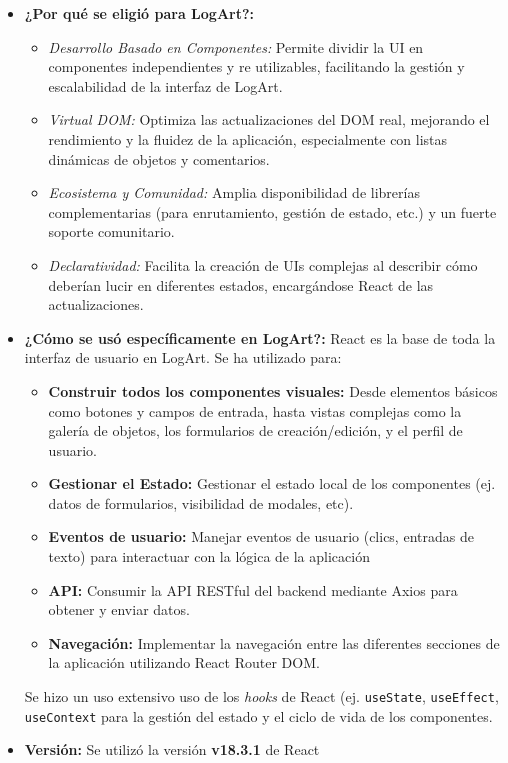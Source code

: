 \begin{itemize}
        \item \textbf{¿Por qué se eligió para LogArt?:}
        \begin{itemize}
            \item \textit{Desarrollo Basado en Componentes:} Permite dividir la UI en componentes independientes y re utilizables, facilitando la gestión y escalabilidad de la interfaz de LogArt.
            \item \textit{Virtual DOM:} Optimiza las actualizaciones del DOM real, mejorando el rendimiento y la fluidez de la aplicación, especialmente con listas dinámicas de objetos y comentarios.
            \item \textit{Ecosistema y Comunidad:} Amplia disponibilidad de librerías complementarias (para enrutamiento, gestión de estado, etc.) y un fuerte soporte comunitario.
            \item \textit{Declaratividad:} Facilita la creación de UIs complejas al describir cómo deberían lucir en diferentes estados, encargándose React de las actualizaciones.
        \end{itemize}
    \item \textbf{¿Cómo se usó específicamente en LogArt?:} React es la base de toda la interfaz de usuario en LogArt. Se ha utilizado para:
        \begin{itemize}
            \item \textbf{Construir todos los componentes visuales:} Desde elementos básicos como botones y campos de entrada, hasta vistas complejas como la galería de objetos, los formularios de creación/edición, y el perfil de usuario.
            \item \textbf{Gestionar el Estado:} Gestionar el estado local de los componentes (ej. datos de formularios, visibilidad de modales, etc).
            \item \textbf{Eventos de usuario:} Manejar eventos de usuario (clics, entradas de texto) para interactuar con la lógica de la aplicación
            \item \textbf{API:} Consumir la API RESTful del backend mediante Axios para obtener y enviar datos.
            \item \textbf{Navegación:} Implementar la navegación entre las diferentes secciones de la aplicación utilizando React Router DOM.
        \end{itemize}
    Se hizo un uso extensivo uso de los \textit{hooks} de React (ej. \texttt{useState}, \texttt{useEffect}, \texttt{useContext} para la gestión del estado y el ciclo de vida de los componentes.
    \item \textbf{Versión:} Se utilizó la versión \textbf{v18.3.1} de React
\end{itemize}

